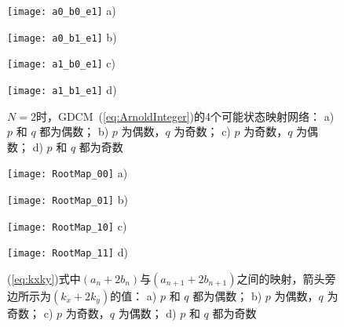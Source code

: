 \begin{figure}[!htb]
	\centering
	\begin{minipage}{0.77\FourImW}
		\centering
		\texttt{[image: a0\_b0\_e1]}
		a)
	\end{minipage} \hspace*{\fill}
	\begin{minipage}{0.8\FourImW}
		\centering
		\texttt{[image: a0\_b1\_e1]}
		b)
	\end{minipage} \hspace*{\fill}
	\begin{minipage}{0.8\FourImW}
		\centering
		\texttt{[image: a1\_b0\_e1]}
		c)
	\end{minipage} \hspace*{\fill}
	\begin{minipage}{0.8\FourImW}
		\centering
		\texttt{[image: a1\_b1\_e1]}
		d)
	\end{minipage}
	\caption{$N=2$时，GDCM~(\ref{eq:ArnoldInteger})的4个可能状态映射网络：
		a) $p$ 和 $q$ 都为偶数； b) $p$ 为偶数，$q$ 为奇数；
		c) $p$ 为奇数，$q$ 为偶数； d) $p$ 和 $q$ 都为奇数}
	\label{fig:perioddistributione1}
\end{figure}

\begin{figure}[!htb]
\centering
\begin{minipage}{\FourImW}
\centering
\texttt{[image: RootMap\_00]}
a)
\end{minipage}\hspace{0.9\figsep}
\begin{minipage}{\FourImW}
\centering
\texttt{[image: RootMap\_01]}
b)
\end{minipage}\hspace{0.9\figsep}
\begin{minipage}{\FourImW}
\centering
\texttt{[image: RootMap\_10]}
c)
\end{minipage}\hspace{0.9\figsep}
\begin{minipage}{1.1\FourImW}
\centering
\texttt{[image: RootMap\_11]}
d)
\end{minipage}
\caption{(\ref{eq:kxky})式中$(a_n+2b_n)$与$(a_{n+1}+2b_{n+1})$之间的映射，箭头旁边所示为$(k_x+2k_y)$的值：
a) $p$ 和 $q$ 都为偶数； b) $p$ 为偶数，$q$ 为奇数；
c) $p$ 为奇数，$q$ 为偶数； d) $p$ 和 $q$ 都为奇数}
\label{fig:rootmap}
\end{figure}

